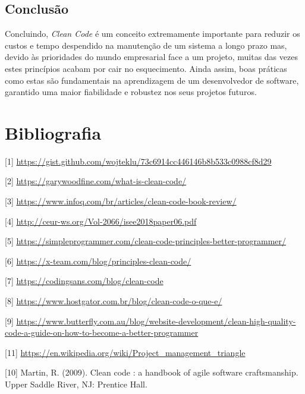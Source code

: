 \documentclass[10pt,portuguese]{article}
\begin{document}
\subsection{Conclusão}

\Par Concluindo, \textit{Clean Code} é um conceito extremamente importante para reduzir os custos e tempo despendido na manutenção de um sistema a longo prazo mas, devido às prioridades do mundo empresarial face a um projeto, muitas das vezes estes princípios acabam por cair no esquecimento. Ainda assim, boas práticas como estas são fundamentais na aprendizagem de um desenvolvedor de software, garantido uma maior fiabilidade e robustez nos seus projetos futuros.
 
\clearpage

\section{Bibliografia}





\vspace{5mm} %

[1] \url{https://gist.github.com/wojteklu/73c6914cc446146b8b533c0988cf8d29}

[2] \url{https://garywoodfine.com/what-is-clean-code/}

[3] \url{https://www.infoq.com/br/articles/clean-code-book-review/}

[4] \url{http://ceur-ws.org/Vol-2066/isee2018paper06.pdf}

[5] \url{https://simpleprogrammer.com/clean-code-principles-better-programmer/}

[6] \url{https://x-team.com/blog/principles-clean-code/}

[7] \url{https://codingsans.com/blog/clean-code}

[8] \url{https://www.hostgator.com.br/blog/clean-code-o-que-e/}

[9] \url{https://www.butterfly.com.au/blog/website-development/clean-high-quality-code-a-guide-on-how-to-become-a-better-programmer}

[11] \url{https://en.wikipedia.org/wiki/Project_management_triangle}

[10] Martin, R. (2009). Clean code : a handbook of agile software craftsmanship. Upper Saddle River, NJ: Prentice Hall.
\end{document}
